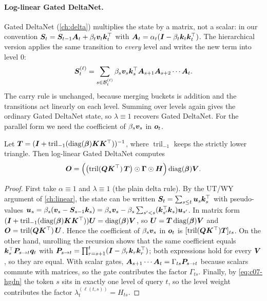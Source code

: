 \paragraph{Log-linear Gated DeltaNet.} Gated DeltaNet (\cref{ch:delta}) multiplies the state by
a matrix, not a scalar: in our convention
$\bm{S}_t = \bm{S}_{t-1}\bm{A}_t + \beta_t\bm{v}_t\bm{k}_t^{\top}$ with
$\bm{A}_t = \alpha_t(\bm{I} - \beta_t\bm{k}_t\bm{k}_t^{\top})$. The hierarchical version applies the same
transition to \emph{every} level and writes the new term into level $0$:
\begin{equation}\label{eq:c07-hgdn}
  \bm{S}_t^{(\ell)} = \sum_{s\in\mathcal{B}_t^{(\ell)}} \beta_s\bm{v}_s\bm{k}_s^{\top} \bm{A}_{s+1}\bm{A}_{s+2}\cdots\bm{A}_t .
\end{equation}
The carry rule is unchanged, because merging buckets is addition and the transitions act
linearly on each level. Summing over levels again gives the ordinary Gated DeltaNet state, so
$\lambda \equiv 1$ recovers Gated DeltaNet. For the parallel form we need the coefficient of
$\beta_s\bm{v}_s$ in $\bm{o}_t$.

\begin{proposition}\label{prop:c07-hgdn-parallel}
Let $\bm{T} = (\bm{I} + \operatorname{tril}_{-1}(\operatorname{diag}(\bm{\beta})\bm{K}\bm{K}^{\top}))^{-1}$, where
$\operatorname{tril}_{-1}$ keeps the strictly lower triangle. Then log-linear Gated DeltaNet
computes
\begin{equation}\label{eq:c07-hgdn-parallel}
  \bm{O} = \Bigl(\bigl(\operatorname{tril}(\bm{Q}\bm{K}^{\top})\,\bm{T}\bigr) \odot \bm{\Gamma} \odot \bm{H}\Bigr)\operatorname{diag}(\bm{\beta})\bm{V} .
\end{equation}
\end{proposition}
\begin{proof}
First take $\alpha \equiv 1$ and $\lambda \equiv 1$ (the plain delta rule). By the UT/WY
argument of \cref{ch:linear}, the state can be written $\bm{S}_t = \sum_{s\le t}\bm{u}_s\bm{k}_s^{\top}$
with pseudo-values $\bm{u}_s = \beta_s(\bm{v}_s - \bm{S}_{s-1}\bm{k}_s)
= \beta_s\bm{v}_s - \beta_s\sum_{s'<s}(\bm{k}_{s'}^{\top}\bm{k}_s)\bm{u}_{s'}$. In matrix form
$(\bm{I} + \operatorname{tril}_{-1}(\operatorname{diag}(\bm{\beta})\bm{K}\bm{K}^{\top}))\bm{U} = \operatorname{diag}(\bm{\beta})\bm{V}$, so
$\bm{U} = \bm{T}\operatorname{diag}(\bm{\beta})\bm{V}$ and $\bm{O} = \operatorname{tril}(\bm{Q}\bm{K}^{\top})\,\bm{U}$. Hence the coefficient of
$\beta_s\bm{v}_s$ in $\bm{o}_t$ is $[\operatorname{tril}(\bm{Q}\bm{K}^{\top})\bm{T}]_{ts}$. On the other hand, unrolling
the recursion shows that the same coefficient equals
$\bm{k}_s^{\top}\bm{P}_{s\to t}\bm{q}_t$ with $\bm{P}_{s\to t} = \prod_{r=s+1}^{t}(\bm{I}-\beta_r\bm{k}_r\bm{k}_r^{\top})$; both
expressions hold for every $\bm{V}$, so they are equal. With scalar gates,
$\bm{A}_{s+1}\cdots\bm{A}_t = \Gamma_{ts}\bm{P}_{s\to t}$ because scalars commute with matrices, so the
gate contributes the factor $\Gamma_{ts}$. Finally, by \cref{eq:c07-hgdn} the token $s$ sits in
exactly one level of query $t$, so the level weight contributes the factor
$\lambda_t^{(\ell(t,s))} = H_{ts}$.
\end{proof}

